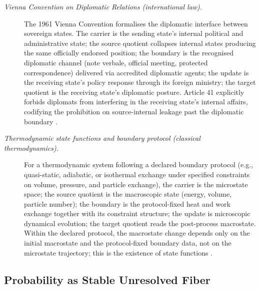 \documentclass[11pt]{article}
\theoremstyle{definition}
\begin{document}
\begin{description}
\item[\emph{Vienna Convention on Diplomatic Relations
(international law).}]
The 1961 Vienna Convention formalises the diplomatic
interface between sovereign states.  The carrier is the
sending state's internal political and administrative
state; the source quotient collapses internal states
producing the same officially endorsed position; the
boundary is the recognised diplomatic channel (note
verbale, official meeting, protected correspondence)
delivered via accredited diplomatic agents; the update
is the receiving state's policy response through its
foreign ministry; the target quotient is the receiving
state's diplomatic posture.  Article 41 explicitly
forbids diplomats from interfering in the receiving
state's internal affairs, codifying the prohibition on
source-internal leakage past the diplomatic boundary
\citep{ViennaConventionDiplomatic1961}.

\item[\emph{Thermodynamic state functions and boundary
protocol (classical thermodynamics).}]
For a thermodynamic system following a declared
boundary protocol (e.g., quasi-static, adiabatic, or
isothermal exchange under specified constraints on
volume, pressure, and particle exchange), the carrier
is the microstate space; the source quotient is the
macroscopic state (energy, volume, particle number);
the boundary is the protocol-fixed heat and work
exchange together with its constraint structure; the
update is microscopic dynamical evolution; the target
quotient reads the post-process macrostate.  Within the
declared protocol, the macrostate change depends only
on the initial macrostate and the protocol-fixed
boundary data, not on the microstate trajectory; this
is the existence of state functions \citep{Callen1985Thermodynamics}.
\end{description}

\subsection{Probability as Stable Unresolved Fiber}\label{sec:status-records-coherence:probability}
\end{document}
